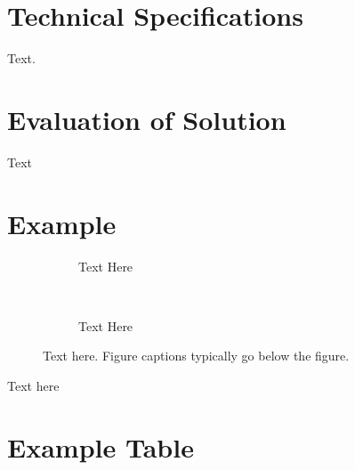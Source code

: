 \documentclass[a4paper, 12pt, english, conference]{IEEEtran}
\begin{document}
    \section{Technical Specifications}
        \label{sec: Technical Specifications}

        Text.


    \section{Evaluation of Solution}
        \label{sec: Evaluation of Solution}

        Text



    \clearpage




    \newpage


    \Appendices

        \section{Example}\label{app:example}
            \begin{figure}[!h]
                \begin{subfigure}[t]{0.45\textwidth}
                    \centering
                    \caption{Text Here}
                    \label{subfig: example1}
                \end{subfigure}
                ~
                \begin{subfigure}[t]{0.45\textwidth}
                    \centering
                    \caption{Text Here}
                    \label{subfig: example2}
                \end{subfigure}
                

                \caption{Text here. Figure captions typically go below the figure.}
                \label{fig: example}
            \end{figure}

            \FloatBarrier

            Text here


        \section{Example Table}
            \label{app: example table}
\end{document}
